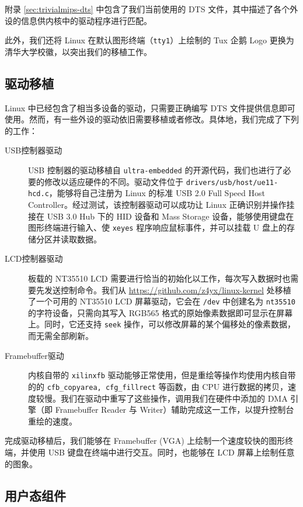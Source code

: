 附录 \ref{sec:trivialmips-dts} 中包含了我们当前使用的 DTS 文件，其中描述了各个外设的信息供内核中的驱动程序进行匹配。

此外，我们还将 Linux 在默认图形终端（\texttt{tty1}）上绘制的 Tux 企鹅 Logo 更换为清华大学校徽，以突出我们的移植工作。

\subsection{驱动移植}

Linux 中已经包含了相当多设备的驱动，只需要正确编写 DTS 文件提供信息即可使用。然而，有一些外设的驱动依旧需要移植或者修改。具体地，我们完成了下列的工作：

\begin{description}
    \item[USB控制器驱动] USB 控制器的驱动移植自 \texttt{ultra-embedded} 的开源代码，我们也进行了必要的修改以适应硬件的不同。驱动文件位于 \texttt{drivers/usb/host/ue11-hcd.c}，能够将自己注册为 Linux 的标准 USB 2.0 Full Speed Host Controller。经过测试，该控制器驱动可以成功让 Linux 正确识别并操作挂接在 USB 3.0 Hub 下的 HID 设备和 Mass Storage 设备，能够使用键盘在图形终端进行输入、使 \texttt{xeyes} 程序响应鼠标事件，并可以挂载 U 盘上的存储分区并读取数据。
    \item[LCD控制器驱动] 板载的 NT35510 LCD 需要进行恰当的初始化以工作，每次写入数据时也需要先发送控制命令。我们从 \url{https://github.com/z4yx/linux-kernel} 处移植了一个可用的 NT35510 LCD 屏幕驱动，它会在 \texttt{/dev} 中创建名为 \texttt{nt35510} 的字符设备，只需向其写入 RGB565 格式的原始像素数据即可显示在屏幕上。同时，它还支持 \texttt{seek} 操作，可以修改屏幕的某个偏移处的像素数据，而无需全部刷新。
    \item[Framebuffer驱动] 内核自带的 \texttt{xilinxfb} 驱动能够正常使用，但是重绘等操作均使用内核自带的的 \texttt{cfb\_copyarea, cfg\_fillrect} 等函数，由 CPU 进行数据的拷贝，速度较慢。我们在驱动中重写了这些操作，调用我们在硬件中添加的 DMA 引擎（即 Framebuffer Reader 与 Writer）辅助完成这一工作，以提升控制台重绘的速度。 
    
\end{description}

完成驱动移植后，我们能够在 Framebuffer (VGA) 上绘制一个速度较快的图形终端，并使用 USB 键盘在终端中进行交互。同时，也能够在 LCD 屏幕上绘制任意的图象。

\subsection{用户态组件}

